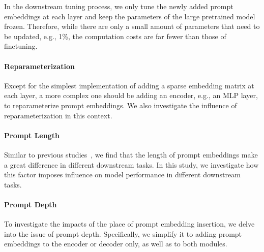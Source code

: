\documentclass[11pt]{article}
\begin{document}
In the downstream tuning process, we only tune the newly added prompt embeddings at each layer and keep the parameters of the large pretrained model frozen. Therefore, while there are only a small amount of parameters that need to be updated, e.g., 1\%, the computation costs are far fewer than those of finetuning. 

\paragraph{Reparameterization} 
Except for the simplest implementation of adding a sparse embedding matrix at each layer, a more complex one should be adding an encoder, e.g., an MLP layer, to reparameterize prompt embeddings. 
We also investigate the influence of reparameterization in this context.

\paragraph{Prompt Length}
Similar to previous studies~\citep{prefix_tuning, p_tuning_v2}, we find that the length of prompt embeddings make a great difference in different downstream tasks. 
In this study, we investigate how this factor imposes influence on model performance in different downstream tasks. 

\paragraph{Prompt Depth}
To investigate the impacts of the place of prompt embedding insertion, we delve into the issue of prompt depth. Specifically, we simplify it to adding prompt embeddings to the encoder or decoder only, as well as to both modules.  
\end{document}
